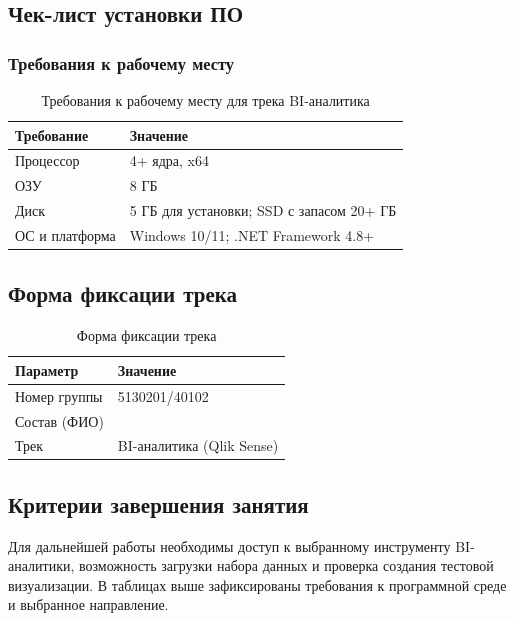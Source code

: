 \documentclass[12pt]{extreport}
\begin{document}
	\subsection{Чек-лист установки ПО}
	
	\subsubsection{Требования к рабочему месту}
	
	\begin{table}[H]
		\centering
		\caption{Требования к рабочему месту для трека BI-аналитика}
		\begin{tabular}{@{}ll@{}}
			\toprule
			Требование & Значение \\
			\midrule
			Процессор & 4+ ядра, x64 \\
			ОЗУ & 8 ГБ \\
			Диск & 5 ГБ для установки; SSD с запасом 20+ ГБ \\
			ОС и платформа & Windows 10/11; .NET Framework 4.8+ \\
			\bottomrule
		\end{tabular}
	\end{table}
	
	
	\subsection{Форма фиксации трека}
	
	\begin{table}[H]
		\centering
		\caption{Форма фиксации трека}
		\begin{tabular}{@{}ll@{}}
			\toprule
			Параметр & Значение \\
			\midrule
			Номер группы & 5130201/40102 \\
			Состав (ФИО) &  \\
			Трек & BI-аналитика (Qlik Sense) \\
			\bottomrule
		\end{tabular}
	\end{table}
	
	\subsection{Критерии завершения занятия}
	
	Для дальнейшей работы необходимы доступ к выбранному инструменту BI-аналитики, возможность загрузки набора данных и проверка создания тестовой визуализации. В таблицах выше зафиксированы требования к программной среде и выбранное направление.
	
\end{document}
